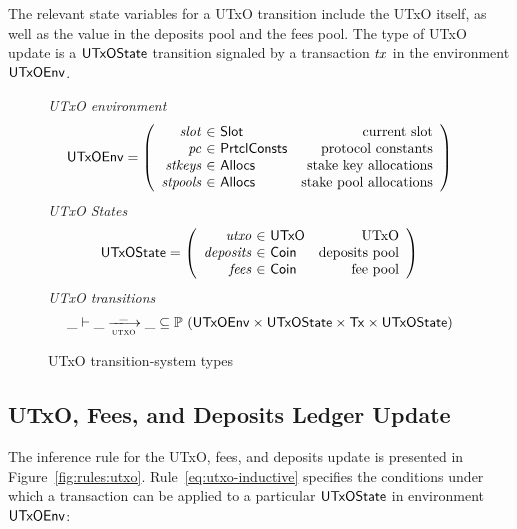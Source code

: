 \documentclass[11pt,a4paper,dvipsnames]{article}
\newcommand{\Tx}{\type{Tx}}
\newcommand{\UTxO}{\type{UTxO}}
\newcommand{\Coin}{\type{Coin}}
\newcommand{\PrtclConsts}{\type{PrtclConsts}}
\newcommand{\Slot}{\type{Slot}}
\newcommand{\Allocs}{\type{Allocs}}
\newcommand{\UTxOState}{\ensuremath{\type{UTxOState}}}
\newcommand{\UTxOEnv}{\type{UTxOEnv}}
\theoremstyle{definition}
\theoremstyle{definition}
\begin{document}
The relevant state variables for a UTxO transition include the UTxO itself,
as well as the value in the deposits pool and the fees pool.
The type of UTxO update is a $\UTxOState$ transition signaled by
a transaction $\mathit{tx}$ in the environment $\UTxOEnv$.


\begin{figure}
  \emph{UTxO environment}
  \begin{equation*}
    \UTxOEnv =
    \left(
      \begin{array}{r@{~\in~}lr}
        \var{slot} & \Slot & \text{current slot}\\
        \var{pc} & \PrtclConsts & \text{protocol constants}\\
        \var{stkeys} & \Allocs & \text{stake key allocations}\\
        \var{stpools} & \Allocs & \text{stake pool allocations}\\
      \end{array}
    \right)
  \end{equation*}
  \emph{UTxO States}
  \begin{equation*}
    \UTxOState =
    \left(
      \begin{array}{r@{~\in~}lr}
        \var{utxo} & \UTxO & \text{UTxO}\\
        \var{deposits} & \Coin & \text{deposits pool}\\
        \var{fees} & \Coin & \text{fee pool}\\
      \end{array}
    \right)
  \end{equation*}
  \emph{UTxO transitions}
  \begin{equation*}
    \_ \vdash
    \var{\_} \trans{utxo}{\_} \var{\_}
    \subseteq \powerset (\UTxOEnv \times \UTxOState \times \Tx \times \UTxOState)
  \end{equation*}
  \caption{UTxO transition-system types}
  \label{fig:ts-types:utxo}
\end{figure}

\clearpage

\subsection{UTxO, Fees, and Deposits Ledger Update}
\label{sec:utxo-ufd}

The inference rule for the UTxO, fees, and deposits update is presented in
Figure~\ref{fig:rules:utxo}.
Rule~\ref{eq:utxo-inductive} specifies the conditions under which a transaction can
be applied to a particular $\UTxOState$ in environment $\UTxOEnv$:
\end{document}
